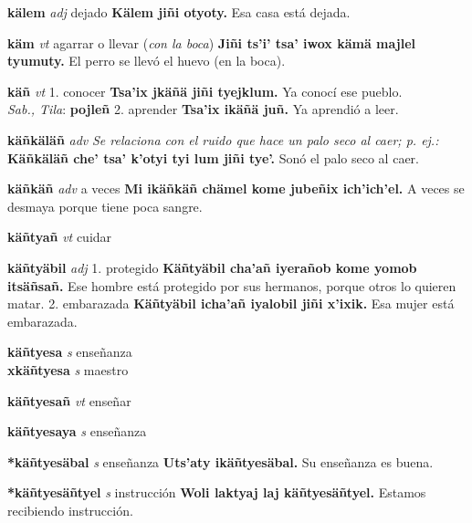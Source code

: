 \documentclass[10pt]{scrbook}
\newcommand{\entry}[1]{\textbf{#1}}
\newcommand{\onedefinition}[1]{#1.}
\newcommand{\nontranslationdef}[1]{\textit{#1}}
\newcommand{\partofspeech}[1]{\textit{#1}}
\newcommand{\spanishtranslation}[1]{#1}
\newcommand{\clarification}[1]{(\textit{#1})}
\newcommand{\cholexample}[1]{\textbf{#1}}
\newcommand{\exampletranslation}[1]{#1}
\newcommand{\dialectvariant}[1]{\\\textit{#1}:}
\newcommand{\dialectword}[1]{\textbf{#1}}
\newcommand{\secondaryentry}[1]{\\\textbf{#1}}
\newcommand{\secondpartofspeech}[1]{\textit{#1}}
\newcommand{\secondtranslation}[1]{#1}
\begin{document}
\begin{multicols}{2}
\entry{kälem}
\partofspeech{adj}
\spanishtranslation{dejado}
\cholexample{Kälem jiñi otyoty.}
\exampletranslation{Esa casa está dejada.}

\entry{käm}
\partofspeech{vt}
\spanishtranslation{agarrar o llevar}
\clarification{con la boca}
\cholexample{Jiñi ts'i' tsa' iwox kämä majlel tyumuty.}
\exampletranslation{El perro se llevó el huevo (en la boca).}

\entry{käñ}
\partofspeech{vt}
\onedefinition{1}
\spanishtranslation{conocer}
\cholexample{Tsa'ix jkäñä jiñi tyejklum.}
\exampletranslation{Ya conocí ese pueblo.}
\dialectvariant{Sab., Tila}
\dialectword{pojleñ}
\onedefinition{2}
\spanishtranslation{aprender}
\cholexample{Tsa'ix ikäñä juñ.}
\exampletranslation{Ya aprendió a leer.}

\entry{käñkäläñ}
\partofspeech{adv}
\nontranslationdef{Se relaciona con el ruido que hace un palo seco al caer; p. ej.:}
\cholexample{Käñkäläñ che' tsa' k'otyi tyi lum jiñi tye'.}
\exampletranslation{Sonó el palo seco al caer.}

\entry{käñkäñ}
\partofspeech{adv}
\spanishtranslation{a veces}
\cholexample{Mi ikäñkäñ chämel kome jubeñix ich'ich'el.}
\exampletranslation{A veces se desmaya porque tiene poca sangre.}

\entry{käñtyañ}
\partofspeech{vt}
\spanishtranslation{cuidar}

\entry{käñtyäbil}
\partofspeech{adj}
\onedefinition{1}
\spanishtranslation{protegido}
\cholexample{Käñtyäbil cha'añ iyerañob kome yomob itsäñsañ.}
\exampletranslation{Ese hombre está protegido por sus hermanos, porque otros lo quieren matar.}
\onedefinition{2}
\spanishtranslation{embarazada}
\cholexample{Käñtyäbil icha'añ iyalobil jiñi x'ixik.}
\exampletranslation{Esa mujer está embarazada.}

\entry{käñtyesa}
\partofspeech{s}
\spanishtranslation{enseñanza}
\secondaryentry{xkäñtyesa}
\secondpartofspeech{s}
\secondtranslation{maestro}

\entry{käñtyesañ}
\partofspeech{vt}
\spanishtranslation{enseñar}

\entry{käñtyesaya}
\partofspeech{s}
\spanishtranslation{enseñanza}

\entry{*käñtyesäbal}
\partofspeech{s}
\spanishtranslation{enseñanza}
\cholexample{Uts'aty ikäñtyesäbal.}
\exampletranslation{Su enseñanza es buena.}

\entry{*käñtyesäñtyel}
\partofspeech{s}
\spanishtranslation{instrucción}
\cholexample{Woli laktyaj laj käñtyesäñtyel.}
\exampletranslation{Estamos recibiendo instrucción.}


\end{multicols}
\end{document}
